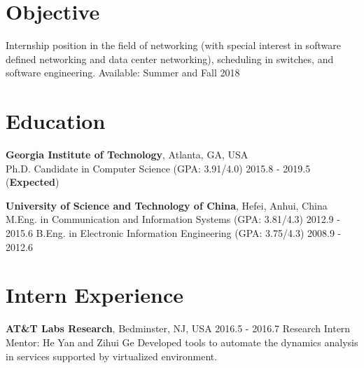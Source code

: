 \documentclass[line,11pt,letter]{includes/cls/myRes}
\begin{document}

\address{266 Ferst Dr, Atlanta, GA 30332, United States}
\address{Cell: +1(404)697-0608. \hspace{5pt} Email: gonglong@gatech.edu}
\begin{resume}


\vspace*{-10pt}
\vspace*{-15pt}
\section{Objective}
\vspace{-4pt}
{\setlength{\parskip}{0pt}
 {Internship position in the field of networking (with special interest in software defined networking and data center networking), scheduling in switches, and software engineering. \hfill{Available: Summer and Fall 2018}\break}
}%
\negspace
\section{Education}
\vspace{-4pt}
{\setlength{\parskip}{0pt}
\textbf{Georgia Institute of Technology}, Atlanta, GA, USA\\
{\hspace*{1em} Ph.D. Candidate in Computer Science (GPA: 3.91/4.0) \hspace{52.5pt} \hfill 2015.8 - 2019.5 (\textbf{Expected})\break}
}
\sspace

{\setlength{\parskip}{0pt}
\textbf{University of Science and Technology of China}, Hefei, Anhui, China\\
{\hspace*{1em} M.Eng. in Communication and Information Systems (GPA: 3.81/4.3) \hspace{52.5pt} \hfill 2012.9 - 2015.6\break}
{\hspace*{1em} B.Eng. in Electronic Information Engineering (GPA: 3.75/4.3) \hspace{52.5pt} \hfill 2008.9 - 2012.6\break}
}
\negspace
\section{Intern Experience}
\vspace{-4pt}
{\setlength{\parskip}{0pt}
{\bf AT\&T Labs Research}, Bedminster, NJ, USA \hfill 2016.5 - 2016.7\break
{\hspace*{1em} Research Intern \hfill Mentor: He Yan and Zihui Ge\break}
{\hspace*{1em} Developed tools to automate the dynamics analysis in services supported by virtualized environment.\break}
}\negspace

\end{resume}
\end{document}
